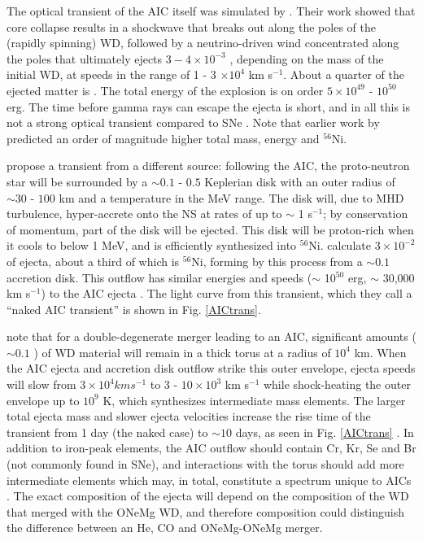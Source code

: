 The optical transient of the AIC itself was simulated by \cite{dess+06}.  Their work showed that core collapse results in a shockwave that breaks out along the poles of the (rapidly spinning) WD, followed by a neutrino-driven wind concentrated along the poles that ultimately ejects $3 - 4 \times 10^{-3}$ {\Msun}, depending on the mass of the initial WD, at speeds in the range of 1 - 3 $\times 10^4$ km s$^{-1}$.  About a quarter of the ejected matter is {\Ni}.  The total energy of the explosion is on order $5 \times 10^{49}$ - $10^{50}$ erg.  The time before gamma rays can escape the ejecta is short, and in all this is not a strong optical transient compared to SNe \citep{metz+09}.  Note that earlier work by \cite{frye+99} predicted an order of magnitude higher total mass, energy and $^{56}$Ni.

\cite{metz+09} propose a transient from a different source: following the AIC, the proto-neutron star will be surrounded by a $\sim 0.1$ - $0.5$ {\Msun} Keplerian disk with an outer radius of $\sim30$ - $100$ km and a temperature in the MeV range.  The disk will, due to MHD turbulence, hyper-accrete onto the NS at rates of up to $\sim$ 1 {\Msun} s$^{-1}$; by conservation of momentum, part of the disk will be ejected.  This disk will be proton-rich when it cools to below 1 MeV, and is efficiently synthesized into $^{56}$Ni.  \citeauthor{metz+09} calculate $3 \times 10^{-2}$ {\Msun} of ejecta, about a third of which is $^{56}$Ni, forming by this process from a $\sim 0.1$ {\Msun} accretion disk.  This outflow has similar energies and speeds ($\sim$ 10$^{50}$ erg, $\sim$ 30,000 km s$^{-1}$) to the AIC ejecta \citep{metz+09}.  The light curve from this transient, which they call a ``naked AIC transient'' is shown in Fig. \ref{AICtrans}.

\citeauthor{metz+09} note that for a double-degenerate merger leading to an AIC, significant amounts ($\sim 0.1$ {\Msun}) of WD material will remain in a thick torus at a radius of $10^4$ km.  When the AIC ejecta and accretion disk outflow strike this outer envelope, ejecta speeds will slow from $3 \times 10^4 km s^{-1}$ to $3$ - $10 \times 10^3$ km s$^{-1}$ while shock-heating the outer envelope up to $10^9$ K, which synthesizes intermediate mass elements.  The larger total ejecta mass and slower ejecta velocities increase the rise time of the transient from 1 day (the naked case) to $\sim 10$ days, as seen in Fig. \ref{AICtrans} \citep{metz+09}.  In addition to iron-peak elements, the AIC outflow should contain Cr, Kr, Se and Br (not commonly found in SNe), and interactions with the torus should add more intermediate elements which may, in total, constitute a spectrum unique to AICs \citep{metz+09}.  The exact composition of the ejecta will depend on the composition of the WD that merged with the ONeMg WD, and therefore composition could distinguish the difference between an He, CO and ONeMg-ONeMg merger.

